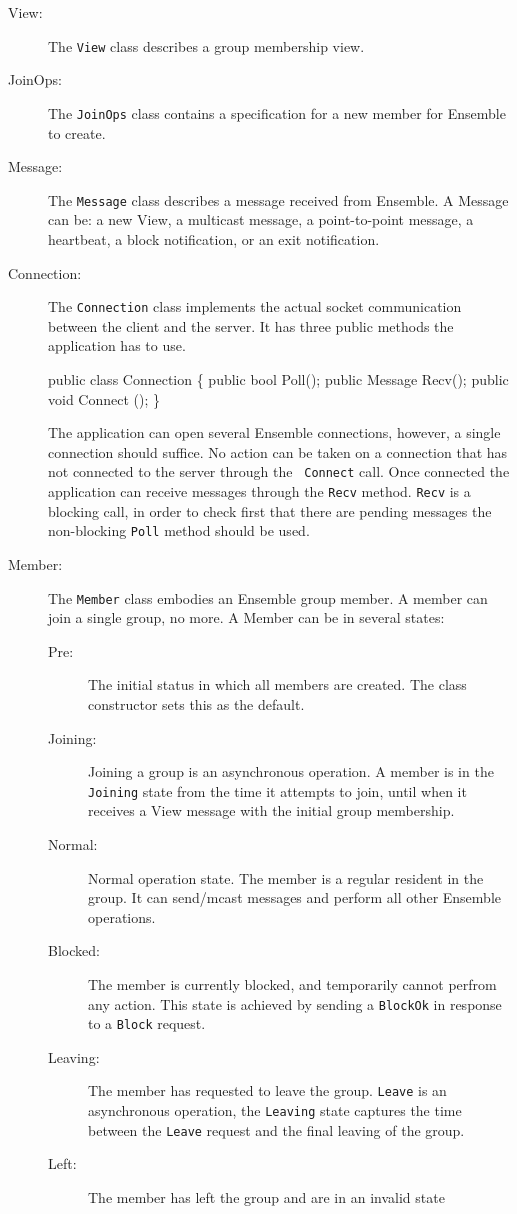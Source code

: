 \begin{description}
\item[View:] The {\tt View} class describes a
group membership view. 

\item[JoinOps:] The {\tt JoinOps} class contains a
specification for a new member for Ensemble to create. 

\item[Message:] The {\tt Message} class describes a message received
  from Ensemble. A Message can be: a new View, a multicast message, a
  point-to-point message, a heartbeat, a block notification, or an
  exit notification. 

\item[Connection:] The {\tt Connection} class implements the actual
  socket communication between the client and the server. It has three
  public methods the application has to use.

  \begin{codebox}
   public class Connection \{
       public bool Poll();	  
       public Message Recv();
       public void Connect ();
  \}
  \end{codebox}

  The application can open several Ensemble connections, however, a
  single connection should suffice. No action can be taken on a
  connection that has not connected to the server through the {\tt
  Connect} call. Once connected the application can receive messages
  through the {\tt Recv} method. {\tt Recv} is a blocking call, in
  order to check first that there are pending messages the
  non-blocking {\tt Poll} method should be used. 
  

\item[Member:] The {\tt Member} class embodies an Ensemble group
  member. A member can join a single group, no more. A Member can be in several states: 
  \begin{description}
    \item[Pre:] The initial status in which all members are
      created. The class constructor sets this as the default.
    \item[Joining:] Joining a group is an asynchronous operation. A
      member is in the {\tt Joining} state from the time it attempts to join,
      until when it receives a View message with the initial group
      membership. 
    \item[Normal:] Normal operation state. The member is a regular
      resident in the group. It can send/mcast messages and
      perform all other Ensemble operations. 
    \item[Blocked:] The member is currently blocked, and temporarily cannot 
      perfrom any action. This state is achieved by sending a {\tt BlockOk}
      in response to a {\tt Block} request. 
    \item[Leaving:] The member has requested to leave the group. {\tt Leave}
      is an asynchronous operation, the {\tt Leaving} state captures
      the time between the {\tt Leave} request and the final leaving
      of the group.
    \item[Left:] The member has left the group and are in an invalid state
  \end{description}


\end{description}

